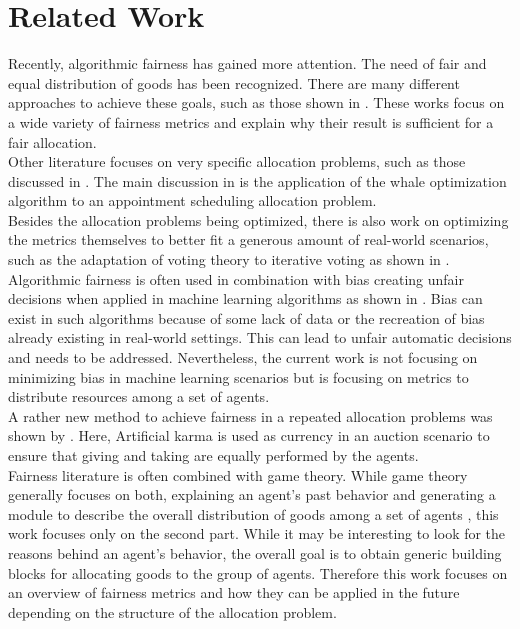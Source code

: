 \documentclass[german, a4paper, 11pt, oneside]{scrbook}
\begin{document}
\chapter{Related Work}
Recently, algorithmic fairness has gained more attention. The need of fair and equal distribution of goods has been recognized. There are many different approaches to achieve these goals, such as those shown in \cite{Ek,Brandt}. These works focus on a wide variety of fairness metrics and explain why their result is sufficient for a fair allocation. \\Other literature focuses on very specific allocation problems, such as those discussed in \cite{Ala.2021}. The main discussion in \cite{Ala.2021} is the application of the whale optimization algorithm to an appointment scheduling allocation problem. \\  Besides the allocation problems being optimized, there is also work on optimizing the metrics themselves to better fit a generous amount of real-world scenarios, such as the adaptation of voting theory to iterative voting as shown in \cite{Bhavnani.2022b}. \\Algorithmic fairness is often used in combination with bias creating unfair decisions when applied in machine learning algorithms as shown in \cite{Mitchell.2021}. Bias can exist in such algorithms because of some lack of data or the recreation of bias already existing in real-world settings. This can lead to unfair automatic decisions and needs to be addressed. \cite{Mitchell.2021} Nevertheless, the current work is not focusing on minimizing bias in machine learning scenarios but is focusing on metrics to distribute resources among a set of agents.
\\ A rather new method to achieve fairness in a repeated allocation problems was shown by \cite{Elokda.2023}. Here, Artificial karma is used as currency in an auction scenario to ensure that giving and taking are equally performed by the agents.
 \\Fairness literature is often combined with game theory.
While game theory generally focuses on both, explaining an agent's past behavior and generating a module to describe the overall distribution of goods among a set of agents \cite{Hotz}, this work focuses only on the second part. While it may be interesting to look for the reasons behind an agent's behavior, the overall goal is to obtain generic building blocks for allocating goods to the group of agents. Therefore this work focuses on an overview of fairness metrics and how they can be applied in the future depending on the structure of the allocation problem.
\end{document}
